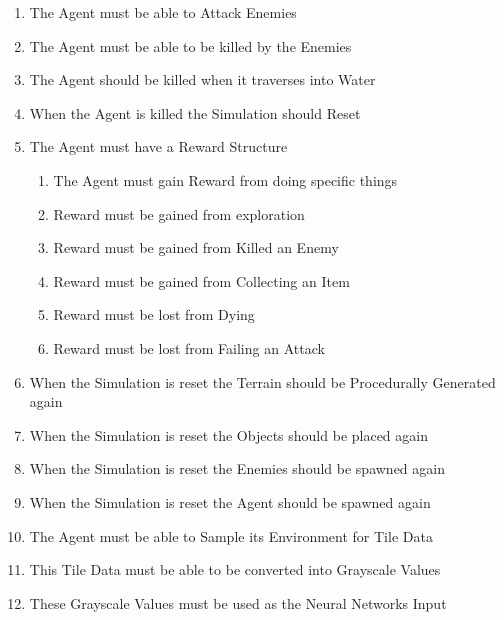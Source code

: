 \begin{flushleft}
\begin{enumerate}
\begin{enumerate}
                    \item The Agent must be able to Attack Enemies
                    \item The Agent must be able to be killed by the Enemies
                    \item The Agent should be killed when it traverses into Water
                    \item When the Agent is killed the Simulation should Reset
                    \item The Agent must have a Reward Structure
                    \begin{enumerate}
                        \item The Agent must gain Reward from doing specific things
                        \item Reward must be gained from exploration
                        \item Reward must be gained from Killed an Enemy
                        \item Reward must be gained from Collecting an Item
                        \item Reward must be lost from Dying
                        \item Reward must be lost from Failing an Attack
                    \end{enumerate}
                    \item When the Simulation is reset the Terrain should be Procedurally Generated again
                    \item When the Simulation is reset the Objects should be placed again
                    \item When the Simulation is reset the Enemies should be spawned again
                    \item When the Simulation is reset the Agent should be spawned again
                    \item The Agent must be able to Sample its Environment for Tile Data
                    \item This Tile Data must be able to be converted into Grayscale Values
                    \item These Grayscale Values must be used as the Neural Networks Input
                \end{enumerate}


\end{enumerate}
\end{flushleft}
